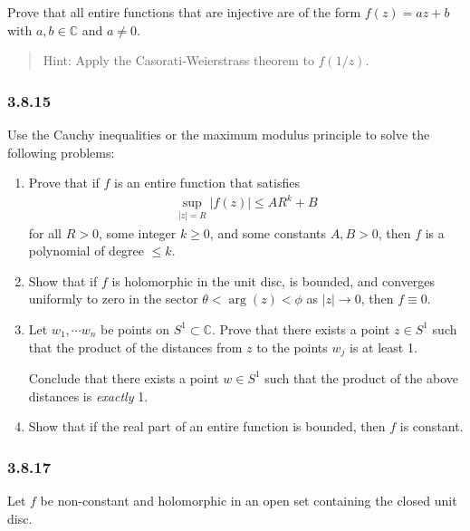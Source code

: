 Prove that all entire functions that are injective are of the form
\(f(z) = az + b\) with \(a,b\in {\mathbb{C}}\) and \(a\neq 0\).

\begin{quote}
Hint: Apply the Casorati-Weierstrass theorem to \(f(1/z)\).
\end{quote}

\hypertarget{section-70}{%
\subsubsection{3.8.15}\label{section-70}}

Use the Cauchy inequalities or the maximum modulus principle to solve
the following problems:

\begin{enumerate}
\def\labelenumi{\alph{enumi}.}
\item
  Prove that if \(f\) is an entire function that satisfies
  \begin{align*}
   \sup _{|z|=R}|f(z)| \leq A R^{k}+B
   \end{align*}
  for all \(R>0\), some integer \(k\geq 0\), and some constants
  \(A, B > 0\), then \(f\) is a polynomial of degree \(\leq k\).
\item
  Show that if \(f\) is holomorphic in the unit disc, is bounded, and
  converges uniformly to zero in the sector \(\theta < \arg(z) < \phi\)
  as \({\left\lvert {z} \right\rvert} \to 0\), then \(f \equiv 0\).
\item
  Let \(w_1, \cdots w_n\) be points on \(S^1 \subset {\mathbb{C}}\).
  Prove that there exists a point \(z\in S^1\) such that the product of
  the distances from \(z\) to the points \(w_j\) is at least 1.

  Conclude that there exists a point \(w\in S^1\) such that the product
  of the above distances is \emph{exactly} 1.
\item
  Show that if the real part of an entire function is bounded, then
  \(f\) is constant.
\end{enumerate}

\hypertarget{section-71}{%
\subsubsection{3.8.17}\label{section-71}}

Let \(f\) be non-constant and holomorphic in an open set containing the
closed unit disc.

